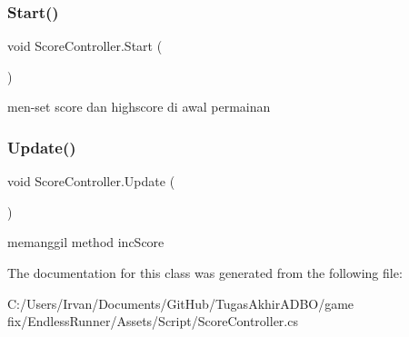 \subsubsection{\texorpdfstring{Start()}{Start()}}
{\footnotesize\ttfamily void Score\+Controller.\+Start (\begin{DoxyParamCaption}{ }\end{DoxyParamCaption})\hspace{0.3cm}{\ttfamily [private]}}



men-\/set score dan highscore di awal permainan 

\hypertarget{class_score_controller_a30682b0eb78ea3820856810083221ee6}{}\label{class_score_controller_a30682b0eb78ea3820856810083221ee6} 
\subsubsection{\texorpdfstring{Update()}{Update()}}
{\footnotesize\ttfamily void Score\+Controller.\+Update (\begin{DoxyParamCaption}{ }\end{DoxyParamCaption})\hspace{0.3cm}{\ttfamily [private]}}



memanggil method inc\+Score 



The documentation for this class was generated from the following file\+:\begin{DoxyCompactItemize}
\item 
C\+:/\+Users/\+Irvan/\+Documents/\+Git\+Hub/\+Tugas\+Akhir\+A\+D\+B\+O/game fix/\+Endless\+Runner/\+Assets/\+Script/Score\+Controller.\+cs\end{DoxyCompactItemize}
